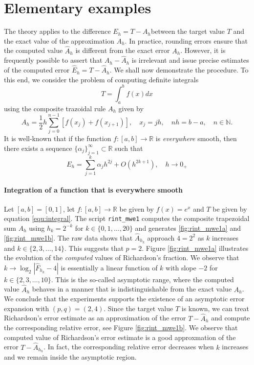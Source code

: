 \documentclass[runningheads]{llncs}
\begin{document}
\section{Elementary examples}

The theory applies to the difference $E_h = T - A_h$between the target value $T$ and the exact value of the approximation $A_h$.
In practice, rounding errors ensure that the computed value $\hat{A}_h$ is different from the exact error $A_h$. However, it is frequently possible to assert that $A_h - \hat{A}_h$ is irrelevant and issue precise estimates of the computed error $\hat{E}_h = T - \hat{A}_h$. We shall now demonstrate the procedure. To this end, we consider the problem of computing definite integrals
\begin{equation} \label{equ:integral}
  T = \int_{a}^b f(x) dx
\end{equation}
using the composite trazoidal rule $A_h$ given by
\begin{equation}
  A_h = \frac{1}{2}h \sum_{j=0}^{n-1} \left[ f(x_j) + f(x_{j+1}) \right], \quad x_j = jh, \quad nh = b-a, \quad n \in \mathbb{N}.
\end{equation}
It is well-known that if the function $f : [a,b] \rightarrow \mathbb{R} $ is \emph{everywhere} smooth, then there exists a sequence $\{\alpha_j\}_{j=1}^\infty \subset \mathbb{R}$ such that 
\begin{equation}
  E_h = \sum_{j=1}^k \alpha _j h^{2j} + O(h^{2k+1}), \quad h \rightarrow 0_+
\end{equation}

\paragraph{Integration of a function that is everywhere smooth}

Let $[a,b]= [0,1]$, let $f : [a, b] \rightarrow \mathbb{R}$ be given by $f(x) = e^x$ and $T$ be given by equation \eqref{equ:integral}.
The script {\tt rint\_mwe1} computes the composite trapezoidal sum $A_h$ using $h_k = 2^{-k}$ for $k \in \{0,1,\dots,20\}$ and generates \ref{fig:rint_mwe1a} and \ref{fig:rint_mwe1b}.
The raw data shows that $\hat{A}_{h_k}$ approach $4 = 2^2$ as $k$ increases and $k \in \{2,3,\dots,14\}$.
This suggests that $p=2$.
Figure \ref{fig:rint_mwe1a} illustrates the evolution of the \emph{computed} values of Richardson's fraction.
We observe that $k \rightarrow \log_2|\hat{F}_{h_k} - 4|$ is essentially a linear function of $k$ with slope $-2$ for $k \in \{2,3,\dots,10\}$.
This is the so-called asymptotic range, where the computed value $\hat{A}_h$  behaves in a manner that is indistinguishable from the exact value $A_h$.
We conclude that the experiments supports the existence of an asymptotic error expansion with $(p,q) = (2,4)$.
Since the target value $T$ is known, we can treat Richardson's error estimate as an approximation of the error $T - \hat{A}_h$ and compute the corresponding relative error, see Figure \ref{fig:rint_mwe1b}.
We observe that computed value of Richardson's error estimate is a good approxmation of the error $T - \hat{A}_{h_h}$. In fact, the corresponding relative error decreases when $k$ increases and we remain inside the asymptotic region.
\end{document}
